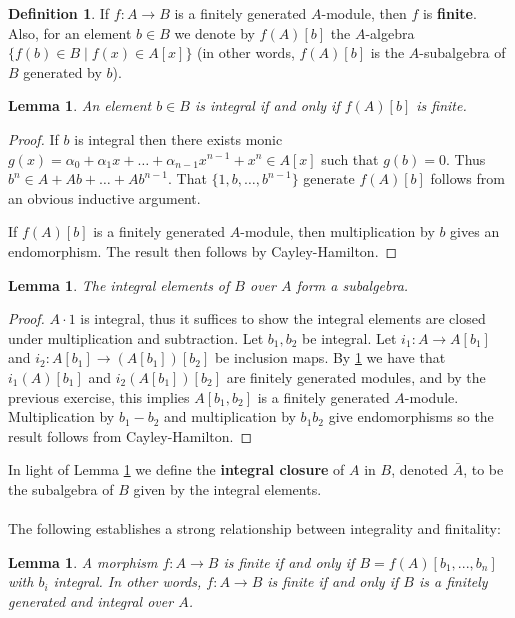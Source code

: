 \documentclass[12pt]{article}
\theoremstyle{plain}
\newtheorem{lemma}[thm]{Lemma}
\theoremstyle{definition}
\newtheorem{defn}[thm]{Definition} %
\begin{document}
\begin{defn}
If $f: A \to B$ is a finitely generated $A$-module, then $f$ is \textbf{finite}. Also, for an element $b \in B$ we denote by $f(A)[b]$ the $A$-algebra $\lbrace f(b) \in B \mid f(x) \in A[x]\rbrace$ (in other words, $f(A)[b]$ is the $A$-subalgebra of $B$ generated by $b$).
\end{defn}
\begin{lemma}\label{lem:int_f(A)fin}
An element $b \in B$ is integral if and only if $f(A)[b]$ is finite.
\end{lemma}
\begin{proof}
If $b$ is integral then there exists monic $g(x) = \alpha_0 + \alpha_1x + \hdots + \alpha_{n-1}x^{n-1} + x^n \in A[x]$ such that $g(b) = 0$. Thus $b^n \in A + Ab + \hdots + Ab^{n-1}$. That $\lbrace 1, b, \hdots, b^{n-1}\rbrace$ generate $f(A)[b]$ follows from an obvious inductive argument.

If $f(A)[b]$ is a finitely generated $A$-module, then multiplication by $b$ gives an endomorphism. The result then follows by Cayley-Hamilton.
\end{proof}
\begin{lemma}
\label{lem:int_elts_subalg}
The integral elements of $B$ over $A$ form a subalgebra.
\end{lemma}
\begin{proof}
$A\cdot 1$ is integral, thus it suffices to show the integral elements are closed under multiplication and subtraction. Let $b_1,b_2$ be integral. Let $i_1: A \to A[b_1]$ and $i_2: A[b_1] \to (A[b_1])[b_2]$ be inclusion maps. By \ref{lem:int_f(A)fin} we have that $i_1(A)[b_1]$ and $i_2(A[b_1])[b_2]$ are finitely generated modules, and by the previous exercise, this implies $A[b_1,b_2]$ is a finitely generated $A$-module. Multiplication by $b_1 - b_2$ and multiplication by $b_1b_2$ give endomorphisms so the result follows from Cayley-Hamilton.
\end{proof}
In light of Lemma \ref{lem:int_elts_subalg} we define the \textbf{integral closure} of $A$ in $B$, denoted $\bar{A}$, to be the subalgebra of $B$ given by the integral elements.\\\\
%
The following establishes a strong relationship between integrality and finitality:
\begin{lemma}\label{lem:finite_integral}
A morphism $f: A \to B$ is finite if and only if $B = f(A)[b_1,...,b_n]$ with $b_i$ integral. In other words, $f: A \to B$ is finite if and only if $B$ is a finitely generated and integral over $A$.
\end{lemma}
\end{document}
